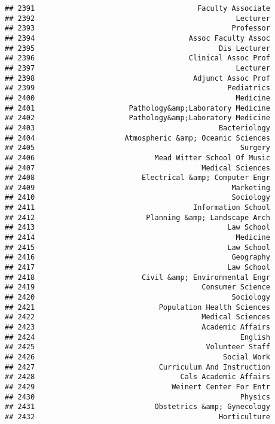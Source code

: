 \documentclass[
]{article}
\begin{document}
\begin{verbatim}
## 2391                                      Faculty Associate
## 2392                                               Lecturer
## 2393                                              Professor
## 2394                                    Assoc Faculty Assoc
## 2395                                           Dis Lecturer
## 2396                                    Clinical Assoc Prof
## 2397                                               Lecturer
## 2398                                     Adjunct Assoc Prof
## 2399                                             Pediatrics
## 2400                                               Medicine
## 2401                      Pathology&amp;Laboratory Medicine
## 2402                      Pathology&amp;Laboratory Medicine
## 2403                                           Bacteriology
## 2404                     Atmospheric &amp; Oceanic Sciences
## 2405                                                Surgery
## 2406                            Mead Witter School Of Music
## 2407                                       Medical Sciences
## 2408                         Electrical &amp; Computer Engr
## 2409                                              Marketing
## 2410                                              Sociology
## 2411                                     Information School
## 2412                          Planning &amp; Landscape Arch
## 2413                                             Law School
## 2414                                               Medicine
## 2415                                             Law School
## 2416                                              Geography
## 2417                                             Law School
## 2418                         Civil &amp; Environmental Engr
## 2419                                       Consumer Science
## 2420                                              Sociology
## 2421                             Population Health Sciences
## 2422                                       Medical Sciences
## 2423                                       Academic Affairs
## 2424                                                English
## 2425                                        Volunteer Staff
## 2426                                            Social Work
## 2427                             Curriculum And Instruction
## 2428                                  Cals Academic Affairs
## 2429                                Weinert Center For Entr
## 2430                                                Physics
## 2431                            Obstetrics &amp; Gynecology
## 2432                                           Horticulture

\end{verbatim}
\end{document}
